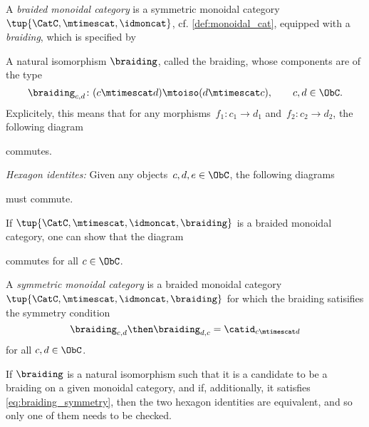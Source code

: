 \begin{ctdefinition}
  A \emph{braided monoidal category} is a symmetric monoidal category~$\tup{\CatC,\mtimescat,\idmoncat}$,  cf. \cref{def:monoidal_cat}, equipped with a \emph{braiding}, which is specified by 
  
  \constit
   \begin{compactenum}
   \item A natural isomorphism $\braiding$, called the braiding, whose components are of the type
   $$\braiding_{c,d}\colon (c\mtimescat d)\mtoiso (d\mtimescat c), \quad \quad c,d \in \ObC.$$
   Explicitely, this means that for any morphisms~$f_1\colon c_1\to d_1$ and~$f_2\colon c_2\to d_2$, the following diagram 
    \begin{center}
    \end{center}
    commutes. 
   \end{compactenum}
  
  \condit
  \begin{compactenum}
    \item \emph{Hexagon identites:} Given any objects~$c,d,e\in \ObC$, the following diagrams 
    \begin{center}
    \end{center}
    \begin{center}
    \end{center}
    must commute.
  \end{compactenum}
\end{ctdefinition}

 \begin{remark} If $\tup{\CatC,\mtimescat,\idmoncat, \braiding}$ is a braided monoidal category, one can show that the diagram 
    \begin{center}
    \end{center}
    commutes for all $c \in \ObC$. 
  \end{remark}

\begin{ctdefinition}
  A \emph{symmetric monoidal category} is a braided monoidal category~$\tup{\CatC,\mtimescat,\idmoncat, \braiding}$ for which the braiding satisifies the symmetry condition 
 \begin{equation}\label{eq:braiding_symmetry}
  \braiding_{c,d} \then \braiding_{d,c} = \catid_{c \mtimescat d}
\end{equation}
  for all $c, d \in \ObC$. 
  \end{ctdefinition}
  
  \begin{remark} If $\braiding$ is a natural isomorphism such that it is a candidate to be a braiding on a given monoidal category, and if, additionally, it satisfies \cref{eq:braiding_symmetry}, then the two hexagon identities are equivalent, and so only one of them needs to be checked. 
 \end{remark}
  
 
